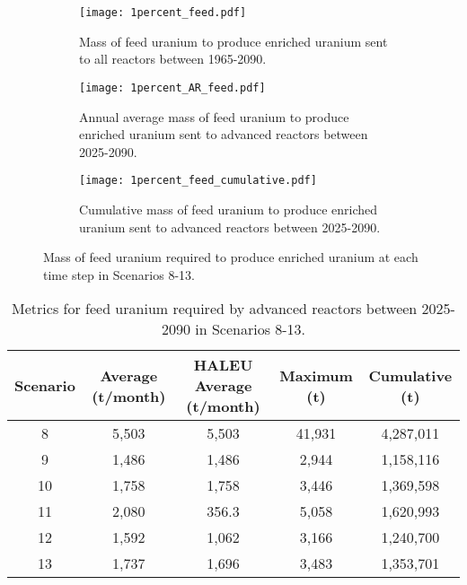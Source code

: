 \begin{figure}
    \centering
    \begin{subfigure}[b]{0.45\textwidth}
        \centering
        \texttt{[image: 1percent\_feed.pdf]}
        \caption{Mass of feed uranium to produce enriched uranium sent to 
        all reactors between 1965-2090.}
        \label{fig:1percent_all_feed}
    \end{subfigure}
    \hfill
    \begin{subfigure}[b]{0.45\textwidth}
        \centering
        \texttt{[image: 1percent\_AR\_feed.pdf]}
        \caption{Annual average mass of feed uranium to produce enriched 
        uranium sent to advanced reactors between 2025-2090.}
        \label{fig:1percent_AR_feed}
    \end{subfigure}
    \begin{subfigure}[b]{0.45\textwidth}
        \centering
        \texttt{[image: 1percent\_feed\_cumulative.pdf]}
        \caption{Cumulative mass of feed uranium to produce enriched uranium sent to 
        advanced reactors between 2025-2090.}
        \label{fig:1percent_feed_cumulative}
    \end{subfigure}
       \caption{Mass of feed uranium required to produce enriched uranium
       at each time step in Scenarios 8-13.}
       \label{fig:1percent_feed}
\end{figure}

\begin{table}
    \centering 
    \caption{Metrics for feed uranium required by advanced reactors 
    between 2025-2090 in Scenarios 8-13.}
    \label{tab:1percent_feed}
    \begin{tabular}{c c c c c}
        \hline
        Scenario & Average (t/month) & \gls{HALEU} Average  
        (t/month) & Maximum (t) & Cumulative (t)\\\hline
        8 & 5,503 & 5,503 & 41,931 & 4,287,011\\
        9 & 1,486 & 1,486 & 2,944 & 1,158,116\\
        10 & 1,758 & 1,758 & 3,446 & 1,369,598\\
        11 & 2,080 & 356.3 & 5,058 & 1,620,993\\
        12 & 1,592 & 1,062 & 3,166 & 1,240,700\\
        13 & 1,737 & 1,696 & 3,483 & 1,353,701\\
        \hline
    \end{tabular}
\end{table}


